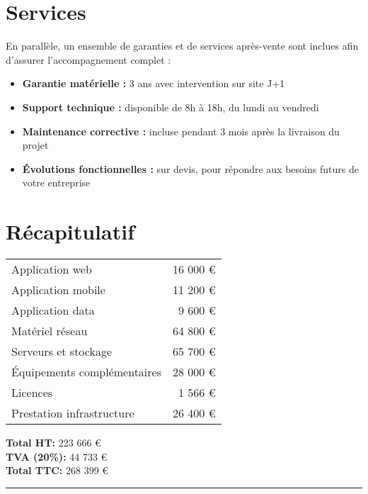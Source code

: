 \documentclass{report}
\begin{document}
\section*{\centering Services}
\vspace{0.2cm}
\noindent En parallèle, un ensemble de garanties et de services après-vente sont inclues afin d'assurer l'accompagnement complet :
\begin{itemize}
    \item \textbf{Garantie matérielle :} 3 ans avec intervention sur site J+1
    \item \textbf{Support technique :} disponible de 8h à 18h, du lundi au vendredi
    \item \textbf{Maintenance corrective :} incluse pendant 3 mois après la livraison du projet
    \item \textbf{Évolutions fonctionnelles :} sur devis, pour répondre aux besoins futurs de votre entreprise
\end{itemize}
\vspace{1cm}

\section*{\centering Récapitulatif}
\vspace{0.2cm}
\begin{table}[ht]
\centering
\begin{tabular}{|l|r|}
\hline
Application web & 16 000 € \\
Application mobile & 11 200 € \\
Application data & 9 600 € \\
Matériel réseau & 64 800 € \\
Serveurs et stockage & 65 700 € \\
Équipements complémentaires & 28 000 € \\
Licences & 1 566 € \\
Prestation infrastructure & 26 400 € \\
\hline
\end{tabular}
\end{table}

\vspace{0.2cm}
\noindent \textbf{Total HT:} 223 666 € \\
\noindent \textbf{TVA (20\%):} 44 733 € \\
\noindent \textbf{Total TTC:} 268 399 € \\

\noindent\rule{\linewidth}{0.4pt}
\end{document}
